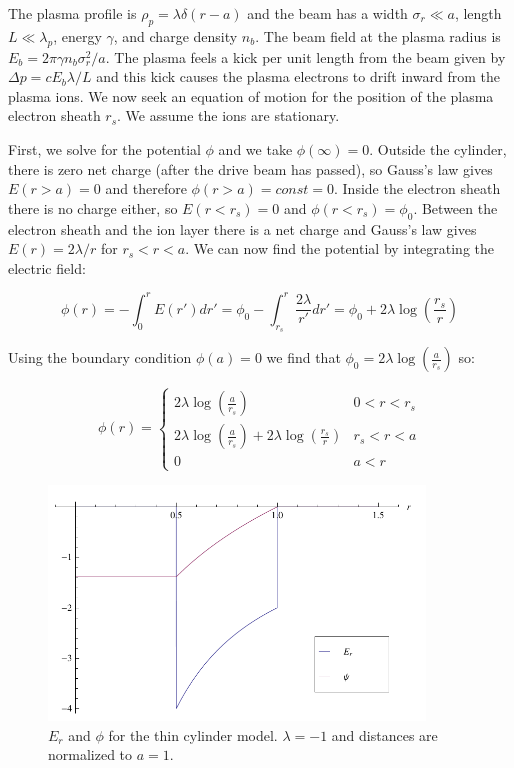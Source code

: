 \documentclass[aps,prl,preprint,groupedaddress]{revtex4-1}
\begin{document}
The plasma profile is $\rho_p = \lambda \delta(r - a)$ and the beam has a width $\sigma_r \ll a$, length $L \ll \lambda_p$, energy $\gamma$, and charge density $n_b$. The beam field at the plasma radius is $E_b = 2\pi \gamma n_b \sigma_r^2/a$. The plasma feels a kick per unit length from the beam given by $\Delta p = c E_b \lambda/L$ and this kick causes the plasma electrons to drift inward from the plasma ions. We now seek an equation of motion for the position of the plasma electron sheath $r_s$. We assume the ions are stationary.

First, we solve for the potential $\phi$ and we take $\phi(\infty) = 0$. Outside the cylinder, there is zero net charge (after the drive beam has passed), so Gauss's law gives $E(r > a) = 0$ and therefore $\phi(r > a) = const = 0$. Inside the electron sheath there is no charge either, so $E(r < r_s) = 0$ and $\phi(r < r_s) = \phi_0$. Between the electron sheath and the ion layer there is a net charge and Gauss's law gives $E(r) = 2\lambda/r$ for $r_s < r < a$. We can now find the potential by integrating the electric field:

\begin{equation}\label{eq:thin_phi}
\phi(r) = -\int_0^r E(r') dr' = \phi_0 - \int_{r_s}^r \frac{2\lambda}{r'}dr' = \phi_0 + 2\lambda \log\left(\frac{r_s}{r}\right)
\end{equation}

Using the boundary condition $\phi(a) = 0$ we find that $\phi_0 = 2\lambda \log\left(\frac{a}{r_s}\right)$ so:

\begin{equation}\label{eq:phi_everywhere}
\phi(r) = \left\{ \begin{array}{lr}
2\lambda \log\left(\frac{a}{r_s}\right) & 0<r<r_s \\
2\lambda \log\left(\frac{a}{r_s}\right) + 2\lambda \log\left(\frac{r_s}{r}\right) & r_s<r<a \\
0 & a<r
\end{array} \right.
\end{equation}

\begin{figure}[ht]\label{fig:fields}
  \centering
    \includegraphics[width=100mm]{./figures/fields.pdf}
      \caption{$E_r$ and $\phi$ for the thin cylinder model. $\lambda = -1$ and distances are normalized to $a=1$.}
\end{figure}
\end{document}
